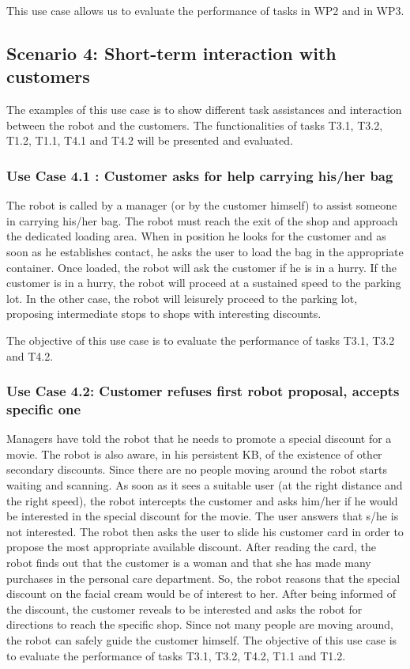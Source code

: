 This use case allows us to evaluate the performance of tasks in WP2 and in WP3. 

\subsection{Scenario 4: Short-term interaction with customers}
The examples of this use case is to show different task assistances and interaction between the robot and the customers. The functionalities of tasks T3.1, T3.2, T1.2, T1.1, T4.1 and T4.2 will be presented and evaluated. 

\subsubsection*{Use Case 4.1 : Customer asks for help carrying his/her bag}
The robot is called by a manager (or by the customer himself) to assist
someone in carrying his/her bag. The robot must reach
the exit of the shop and approach the dedicated loading area. When
in position he looks for the customer and as soon as he establishes
contact, he asks the user to load the bag in the appropriate container.
Once loaded, the robot will ask the customer if he is in a hurry.
If the customer is in a hurry, the robot will proceed at a sustained
speed to the parking lot. In the other case, the robot will leisurely
proceed to the parking lot, proposing intermediate stops to shops
with interesting discounts.

The objective of this use case is to evaluate the performance of tasks T3.1, T3.2 and T4.2.
 
\subsubsection*{Use Case 4.2: Customer refuses first robot proposal, accepts specific one} Managers have told the robot that he needs to promote a special discount
for a movie. The robot is also aware, in his persistent KB, of the
existence of other secondary discounts. Since there are no people
moving around the robot starts waiting and scanning. As soon as it
sees a suitable user (at the right distance and the right speed),
the robot intercepts the customer and asks him/her if he would be interested
in the special discount for the movie. The user answers that s/he is not interested.
The robot then asks the user to slide his customer card in order to
propose the most appropriate available discount. After reading the
card, the robot finds out that the customer is a woman and that she
has made many purchases in the personal care department. 
So, the robot reasons that the special discount on the facial cream would be of interest
to her. After being informed of the discount, the customer reveals
to be interested and asks the robot for directions to reach the specific
shop. Since not many people are moving around, the robot can safely
guide the customer himself.
The objective of this use case is to evaluate the performance of tasks T3.1, T3.2, T4.2, T1.1 and T1.2.

